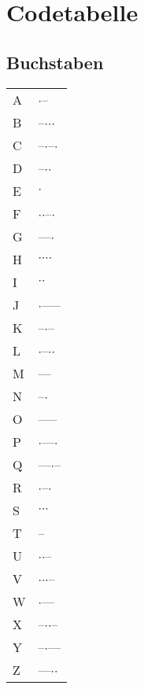 \documentclass{scrartcl}
\newcommand{\dit}{{\LARGE\hskip1pt$\cdot$\hskip1pt}}
\newcommand{\dah}{{\LARGE\hskip1pt--\hskip1pt}}
\begin{document}
  \newpage
  
  \section{Codetabelle}
    \begin{minipage}[t]{.25\textwidth}
      \setlength{\parskip}{.5\baselineskip}
      \subsection{Buchstaben}
      
      \begin{tabular}{ll}
        A & \dit \dah \\
        B & \dah \dit \dit \dit \\
        C &	\dah \dit \dah \dit \\
        D &	\dah \dit \dit \\
        E &	\dit \\
        F &	\dit \dit \dah \dit \\
        G &	\dah \dah \dit \\
        H &	\dit \dit \dit \dit \\
        I &	\dit \dit \\
        J &	\dit \dah \dah \dah \\
        K &	\dah \dit \dah \\
        L &	\dit \dah \dit \dit \\
        M &	\dah \dah \\
        N &	\dah \dit \\
        O &	\dah \dah \dah \\
        P &	\dit \dah \dah \dit \\
        Q &	\dah \dah \dit \dah \\
        R &	\dit \dah \dit \\
        S &	\dit \dit \dit \\
        T &	\dah \\
        U &	\dit \dit \dah \\
        V &	\dit \dit \dit \dah \\
        W &	\dit \dah \dah \\
        X &	\dah \dit \dit \dah \\
        Y	& \dah \dit \dah \dah \\
        Z &	\dah \dah \dit \dit
      \end{tabular}
    \end{minipage}
    \qquad
\end{document}
